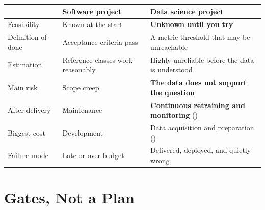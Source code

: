 \begin{longtable}{@{}L{3.4cm}L{5.1cm}L{5.9cm}@{}}
\toprule
{}
& \textbf{Software project} & \textbf{Data science project} \\
\midrule
\endhead
Feasibility & Known at the start & \textbf{Unknown until you try} \\
Definition of done & Acceptance criteria pass & A metric threshold that may be unreachable \\
Estimation & Reference classes work reasonably & Highly unreliable before the data is understood \\
Main risk & Scope creep & \textbf{The data does not support the question} \\
After delivery & Maintenance & \textbf{Continuous retraining and monitoring} () \\
Biggest cost & Development & Data acquisition and preparation () \\
Failure mode & Late or over budget & Delivered, deployed, and quietly wrong \\
\bottomrule
\end{longtable}

\section{Gates, Not a Plan}


